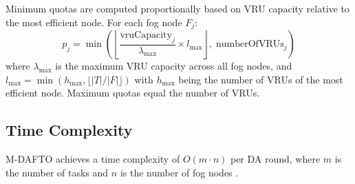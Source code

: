 Minimum quotas are computed proportionally based on VRU capacity relative to the most efficient node. For each fog node $F_j$:
\begin{equation}
p_j = \min\left(\left\lfloor \frac{\text{vruCapacity}_j}{\lambda_{\max}} \times l_{\max} \right\rfloor, \; \text{numberOfVRUs}_j\right)
\end{equation}
where $\lambda_{\max}$ is the maximum VRU capacity across all fog nodes, and $l_{\max} = \min(h_{\max}, \lfloor |T| / |F| \rfloor)$ with $h_{\max}$ being the number of VRUs of the most efficient node. Maximum quotas equal the number of VRUs.

\subsection{Time Complexity}

M-DAFTO achieves a time complexity of $O(m \cdot n)$ per DA round, where $m$ is the number of tasks and $n$ is the number of fog nodes \cite{swain2024mdafto}.